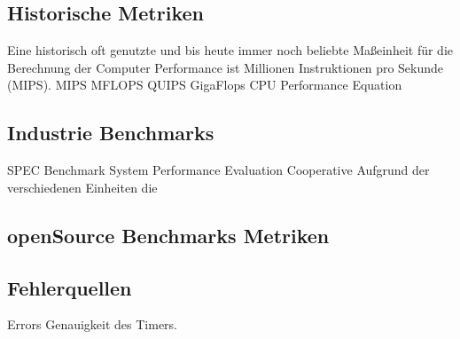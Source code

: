 \subsection{Historische Metriken}
\label{subsec:historic}

Eine historisch oft genutzte und bis heute immer noch beliebte Maßeinheit für die Berechnung der Computer Performance ist Millionen Instruktionen pro Sekunde (MIPS).
MIPS MFLOPS QUIPS
GigaFlops
CPU Performance Equation


\subsection{Industrie Benchmarks}
\label{subsec:industry}

SPEC Benchmark System Performance Evaluation Cooperative
Aufgrund der verschiedenen Einheiten die 


\subsection{openSource Benchmarks Metriken}
\label{subsec:opensource}

\subsection{Fehlerquellen}
\label{subsec:fail}

Errors
Genauigkeit des Timers.
